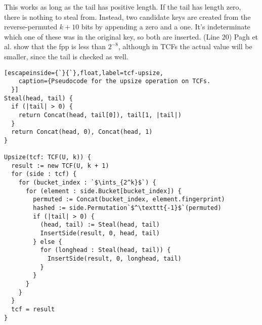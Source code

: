 \documentclass[sigconf, nonacm]{acmart}
\newcommand{\ints}{\mathbb{Z}}
\newcommand{\dotcup}{\ensuremath{\mathaccent\cdot\cup}}
\begin{document}
This works as long as the tail has positive length.
If the tail has length zero, there is nothing to steal from.
Instead, two candidate keys are created from the reverse-permuted $k+10$ bits by appending a zero and a one.
It's indeterminate which one of these was in the original key, so both are inserted. (Line 20)
Pagh et al. show that the fpp is less than $2^{-8}$, although in TCFs the actual value will be smaller, since the tail is checked as well.~\cite{psw}

\begin{lstlisting}[escapeinside={`}{`},float,label=tcf-upsize,
    caption={Pseudocode for the upsize operation on TCFs.
  }]
Steal(head, tail) {
  if (|tail| > 0) {
    return Concat(head, tail[0]), tail[1, |tail|)
  }
  return Concat(head, 0), Concat(head, 1)
}

Upsize(tcf: TCF(U, k)) {
  result := new TCF(U, k + 1)
  for (side : tcf) {
    for (bucket_index : `$\ints_{2^k}$`) {
      for (element : side.Bucket[bucket_index]) {
        permuted := Concat(bucket_index, element.fingerprint)
        hashed := side.Permutation`$^\texttt{-1}$`(permuted)
        if (|tail| > 0) {
          (head, tail) := Steal(head, tail)
          InsertSide(result, 0, head, tail)
        } else {
          for (longhead : Steal(head, tail)) {
            InsertSide(result, 0, longhead, tail)
          }
        }
      }
    }
  }
  tcf = result
}
\end{lstlisting}





\end{document}

